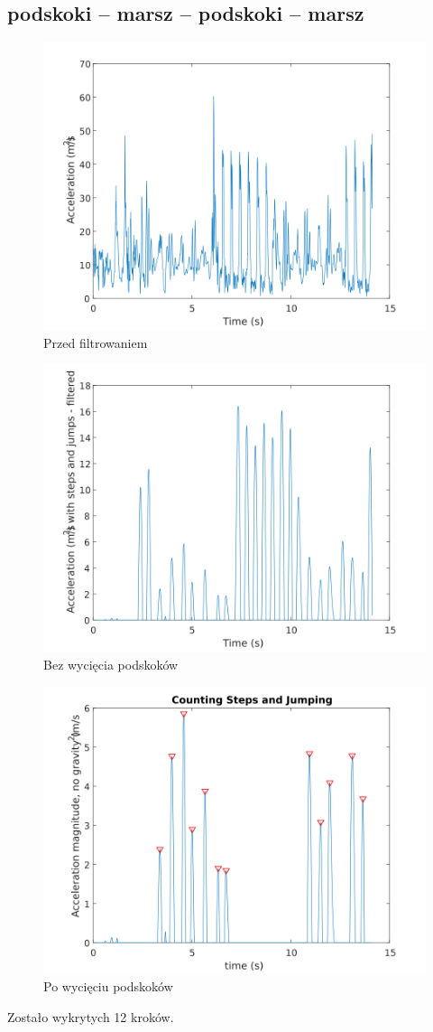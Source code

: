 \documentclass[a4paper, 12pt, titlepage]{article}
\begin{document}
        \subsection{podskoki -- marsz -- podskoki -- marsz}
            \begin{figure}[H]
                \centering
                \includegraphics[width=0.7\columnwidth]
                    {krok3a.png}
                \caption{Przed filtrowaniem}
            \end{figure}\noindent
            \begin{figure}[H]
                \centering
                \includegraphics[width=0.7\columnwidth]
                    {krok3.png}
                \caption{Bez wycięcia podskoków}
            \end{figure}\noindent
            \begin{figure}[H]
                \centering
                \includegraphics[width=0.7\columnwidth]
                    {krok3b.png}
                \caption{Po wycięciu podskoków}
            \end{figure}\noindent
            Zostało wykrytych 12 kroków.
\end{document}
